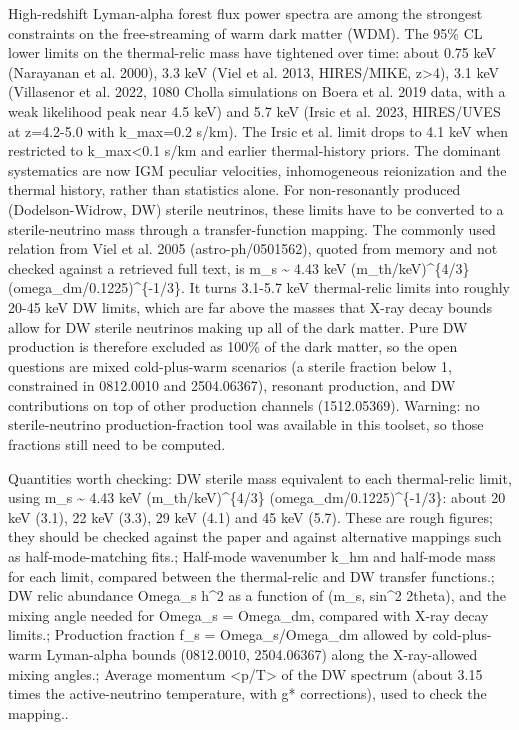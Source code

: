 \documentclass[11pt,a4paper]{article}
\begin{document}
High-redshift Lyman-alpha forest flux power spectra are among the strongest constraints on the free-streaming of warm dark matter (WDM). The 95\% CL lower limits on the thermal-relic mass have tightened over time: about 0.75 keV (Narayanan et al. 2000), 3.3 keV (Viel et al. 2013, HIRES/MIKE, z\textgreater{}4), 3.1 keV (Villasenor et al. 2022, 1080 Cholla simulations on Boera et al. 2019 data, with a weak likelihood peak near 4.5 keV) and 5.7 keV (Irsic et al. 2023, HIRES/UVES at z=4.2-5.0 with k\_max=0.2 s/km). The Irsic et al. limit drops to 4.1 keV when restricted to k\_max\textless{}0.1 s/km and earlier thermal-history priors. The dominant systematics are now IGM peculiar velocities, inhomogeneous reionization and the thermal history, rather than statistics alone. For non-resonantly produced (Dodelson-Widrow, DW) sterile neutrinos, these limits have to be converted to a sterile-neutrino mass through a transfer-function mapping. The commonly used relation from Viel et al. 2005 (astro-ph/0501562), quoted from memory and not checked against a retrieved full text, is m\_s \textasciitilde{} 4.43 keV (m\_th/keV)\textasciicircum{}\{4/3\} (omega\_dm/0.1225)\textasciicircum{}\{-1/3\}. It turns 3.1-5.7 keV thermal-relic limits into roughly 20-45 keV DW limits, which are far above the masses that X-ray decay bounds allow for DW sterile neutrinos making up all of the dark matter. Pure DW production is therefore excluded as 100\% of the dark matter, so the open questions are mixed cold-plus-warm scenarios (a sterile fraction below 1, constrained in 0812.0010 and 2504.06367), resonant production, and DW contributions on top of other production channels (1512.05369). Warning: no sterile-neutrino production-fraction tool was available in this toolset, so those fractions still need to be computed.

Quantities worth checking: DW sterile mass equivalent to each thermal-relic limit, using m\_s \textasciitilde{} 4.43 keV (m\_th/keV)\textasciicircum{}\{4/3\} (omega\_dm/0.1225)\textasciicircum{}\{-1/3\}: about 20 keV (3.1), 22 keV (3.3), 29 keV (4.1) and 45 keV (5.7). These are rough figures; they should be checked against the paper and against alternative mappings such as half-mode-matching fits.; Half-mode wavenumber k\_hm and half-mode mass for each limit, compared between the thermal-relic and DW transfer functions.; DW relic abundance Omega\_s h\textasciicircum{}2 as a function of (m\_s, sin\textasciicircum{}2 2theta), and the mixing angle needed for Omega\_s = Omega\_dm, compared with X-ray decay limits.; Production fraction f\_s = Omega\_s/Omega\_dm allowed by cold-plus-warm Lyman-alpha bounds (0812.0010, 2504.06367) along the X-ray-allowed mixing angles.; Average momentum \textless{}p/T\textgreater{} of the DW spectrum (about 3.15 times the active-neutrino temperature, with g* corrections), used to check the mapping..
\end{document}

